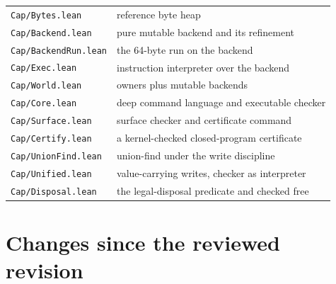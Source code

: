\documentclass[10pt,a4paper]{article}
\newcommand{\file}[1]{\texttt{\small #1}}
\begin{document}
\begin{center}
\begin{tabular}{@{}ll@{}}
\file{Cap/Bytes.lean} & reference byte heap \\
\file{Cap/Backend.lean} & pure mutable backend and its refinement \\
\file{Cap/BackendRun.lean} & the 64-byte run on the backend \\
\file{Cap/Exec.lean} & instruction interpreter over the backend \\
\file{Cap/World.lean} & owners plus mutable backends \\
\file{Cap/Core.lean} & deep command language and executable checker \\
\file{Cap/Surface.lean} & surface checker and certificate command \\
\file{Cap/Certify.lean} & a kernel-checked closed-program certificate \\
\file{Cap/UnionFind.lean} & union-find under the write discipline \\
\file{Cap/Unified.lean} & value-carrying writes, checker as interpreter \\
\file{Cap/Disposal.lean} & the legal-disposal predicate and checked free \\
\bottomrule
\end{tabular}
\end{center}

\section{Changes since the reviewed revision}
\end{document}
